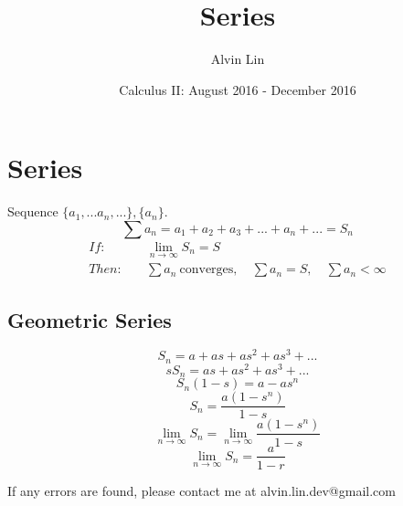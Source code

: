 \documentclass[letterpaper, 12pt]{article}
\title{Series}
\author{Alvin Lin}
\date{Calculus II: August 2016 - December 2016}
\begin{document}
\maketitle

\section*{Series}
Sequence \( \bigg\{a_{1},...a_{n},...\bigg\}, \bigg\{a_{n}\bigg\} \).
\[ \sum{a_{n}} = a_{1}+a_{2}+a_{3}+...+a_{n}+... = S_{n} \]
\begin{align*}
  If: & \quad \lim_{n\to\infty}{S_{n}} = S \\
  Then: & \quad \sum{a_{n}} \mathrm{\ converges}, \quad \sum{a_{n}} = S,
    \quad \sum{a_{n}}<\infty
\end{align*}

\subsection*{Geometric Series}
\[ S_{n} = a+as+as^{2}+as^{3}+... \]
\[ sS_{n} = as+as^{2}+as^{3}+... \]
\[ S_{n}(1-s) = a-as^{n} \]
\[ S_{n} = \frac{a(1-s^{n})}{1-s} \]
\[ \lim_{n\to\infty}{S_{n}} = \lim_{n\to\infty}{\frac{a(1-s^{n})}{1-s}} \]
\[ \lim_{n\to\infty}{S_{n}} = \frac{a}{1-r} \]

\begin{center}
  If any errors are found, please contact me at alvin.lin.dev@gmail.com
\end{center}
\end{document}
